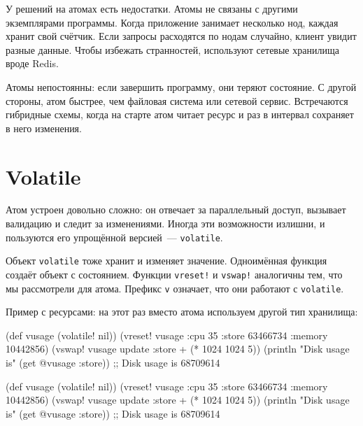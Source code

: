У решений на атомах есть недостатки. Атомы не связаны с другими экземплярами
программы. Когда приложение занимает несколько нод, каждая хранит свой
счётчик. Если запросы расходятся по нодам случайно, клиент увидит разные
данные. Чтобы избежать странностей, используют сетевые хранилища вроде Redis.


Атомы непостоянны: если завершить программу, они теряют состояние. С другой
стороны, атом быстрее, чем файловая система или сетевой сервис. Встречаются
гибридные схемы, когда на старте атом читает ресурс и раз в интервал сохраняет в
него изменения.

\section{Volatile}

Атом устроен довольно сложно: он отвечает за параллельный доступ, вызывает
валидацию и следит за изменениями. Иногда эти возможности излишни, и пользуются
его упрощённой версией~--- \verb|volatile|.


Объект \verb|volatile| тоже хранит и изменяет значение. Одноимённая функция
создаёт объект с состоянием. Функции \verb|vreset!| и \verb|vswap!|
аналогичны тем, что мы рассмотрели для атома. Префикс \verb|v| означает, что
они работают с \verb|volatile|.

Пример с ресурсами: на этот раз вместо атома используем другой тип хранилища:

\ifnarrow

\begin{english}
  \begin{clojure}
(def vusage (volatile! nil))
(vreset! vusage
         {:cpu 35
          :store 63466734
          :memory 10442856})
(vswap! vusage
  update :store + (* 1024 1024 5))
(println
  "Disk usage is" (get @vusage :store))
;; Disk usage is 68709614
  \end{clojure}
\end{english}

\else

\begin{english}
  \begin{clojure}
(def vusage (volatile! nil))
(vreset! vusage
         {:cpu 35
          :store 63466734
          :memory 10442856})
(vswap! vusage update :store + (* 1024 1024 5))
(println "Disk usage is" (get @vusage :store))
;; Disk usage is 68709614
  \end{clojure}
\end{english}

